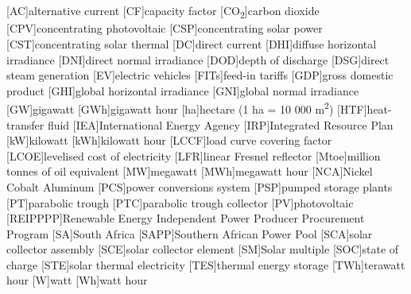 {}
\chapter*{\listacroname}
\begin{acronym}[XXXXX]
  	[AC]{alternative current}
  	[CF]{capacity factor}
  	[CO\textsubscript{2}]{carbon dioxide}
    [CPV]{concentrating photovoltaic}
    [CSP]{concentrating solar power}
    [CST]{concentrating solar thermal} 
    [DC]{direct current}
    [DHI]{diffuse horizontal irradiance}
    [DNI]{direct normal irradiance}
	[DOD]{depth of discharge}
    [DSG]{direct steam generation}
    [EV]{electric vehicles}
    [FITs]{feed-in tariffs} 
    [GDP]{gross domestic product}
    [GHI]{global horizontal irradiance}
    [GNI]{global normal irradiance}
    [GW]{gigawatt}
    [GWh]{gigawatt hour} 
    [ha]{hectare (1 ha = 10 000 m\textsuperscript{2})} 
    [HTF]{heat-transfer fluid} 
    [IEA]{International Energy Agency}
    [IRP]{Integrated Resource Plan}
    [kW]{kilowatt}
    [kWh]{kilowatt hour}
    [LCCF]{load curve covering factor}
    [LCOE]{levelised cost of electricity}
    [LFR]{linear Fresnel reflector}
    [Mtoe]{million tonnes of oil equivalent}
    [MW]{megawatt}
    [MWh]{megawatt hour}
    [NCA]{Nickel Cobalt Aluminum}
    [PCS]{power conversions system}
    [PSP]{pumped storage plants}
    [PT]{parabolic trough}
    [PTC]{parabolic trough collector}
    [PV]{photovoltaic}
    [REIPPPP]{Renewable Energy Independent Power Producer Procurement Program}
    [SA]{South Africa}
    [SAPP]{Southern African Power Pool}
    [SCA]{solar collector assembly}
    [SCE]{solar collector element}
    [SM]{Solar multiple}
    [SOC]{state of charge}
    [STE]{solar thermal electricity}
    [TES]{thermal energy storage}
    [TWh]{terawatt hour}
    [W]{watt}
    [Wh]{watt hour}
\end{acronym}
